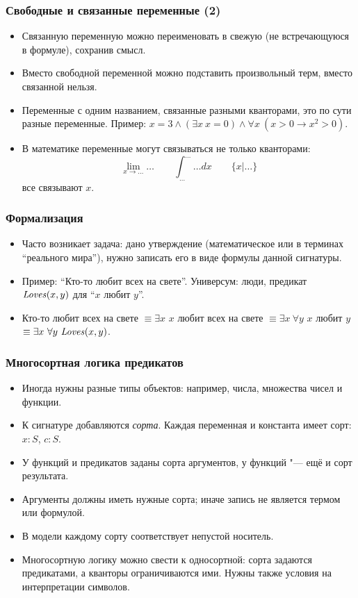 \documentclass[10pt]{beamer}
\begin{document}
\begin{frame}
    \frametitle{Свободные и связанные переменные (2)}
    \begin{itemize}
        \item Связанную переменную можно переименовать в свежую (не встречающуюся в формуле), сохранив смысл.
        \item Вместо свободной переменной можно подставить произвольный терм, вместо связанной нельзя.
        \item Переменные с одним названием, связанные разными кванторами, это по сути разные переменные. Пример: $x = 3 \land (\exists x ~ x=0) \land \forall x ~ (x > 0 \to x^2 > 0)$.
        \item В математике переменные могут связываться не только кванторами: \pause
        \[ \lim_{x \to \ldots} \ldots \qquad \int_{\ldots}^{\ldots} \ldots dx \qquad \{x|\ldots\} \]
        все связывают $x$.
    \end{itemize}
\end{frame}

\begin{frame}
   \frametitle{Формализация}
   \begin{itemize}
       \item Часто возникает задача: дано утверждение (математическое или в терминах \enquote{реального мира}), нужно записать его в виде формулы данной сигнатуры.
       \item Пример: \enquote{Кто-то любит всех на свете}. Универсум: люди, предикат $\mathit{Loves}(x, y)$ для \enquote{$x$ любит $y$}.
       \item Кто-то любит всех на свете $\equiv \exists x $ $x$ любит всех на свете \pause $\equiv \exists x ~ \forall y $ $x$ любит $y$ \pause $\equiv \exists x ~ \forall y ~ \mathit{Loves}(x, y)$.
   \end{itemize}
\end{frame}

\begin{frame}
    \frametitle{Многосортная логика предикатов}
    \begin{itemize}
        \item Иногда нужны разные типы объектов: например, числа, множества чисел и функции.
        \item К сигнатуре добавляются \emph{сорта}. Каждая переменная и константа имеет сорт: $x:S$, $c:S$.
        \item У функций и предикатов заданы сорта аргументов, у функций "--- ещё и сорт результата.
        \item Аргументы должны иметь нужные сорта; иначе запись не является термом или формулой.
        \item В модели каждому сорту соответствует непустой носитель.
        \item Многосортную логику можно свести к односортной: сорта задаются предикатами, а кванторы ограничиваются ими. Нужны также условия на интерпретации символов.
    \end{itemize}
\end{frame}
\end{document}
